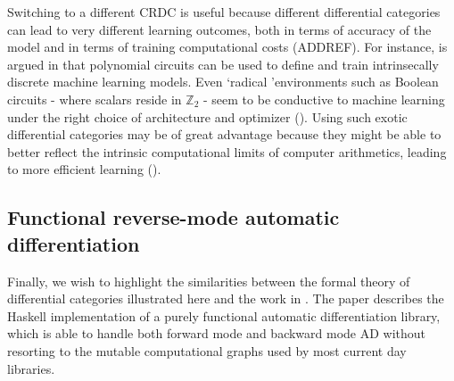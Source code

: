 \documentclass[11pt,a4paper,openright,twoside]{report}
\theoremstyle{plain}
\theoremstyle{definition}
\begin{document}
Switching to a different CRDC is useful because different differential categories can lead to very different learning outcomes, both in terms of accuracy of the model and in terms of training computational costs (ADDREF).
For instance, is argued in \cite{wilson2022categories} that polynomial circuits can be used to define and train intrinsecally discrete machine learning models. Even \lq radical \rq environments such as Boolean circuits - where scalars reside in $\mathbb{Z}_2$ - seem to be conductive to machine learning under the right choice of architecture and optimizer (\cite{wilson2021reverse}). Using such exotic differential categories may be of great advantage because they might be able to better reflect the intrinsic computational limits of computer arithmetics, leading to more efficient learning (\cite{wilson2022categories}). 


\subsection{Functional reverse-mode automatic differentiation}

Finally, we wish to highlight the similarities between the formal theory of differential categories illustrated here and the work in \cite{elliott2018simple}. The paper describes the Haskell implementation of a purely functional automatic differentiation library, which is able to handle both forward mode and backward mode AD without resorting to the mutable computational graphs used by most current day libraries. 
\end{document}
